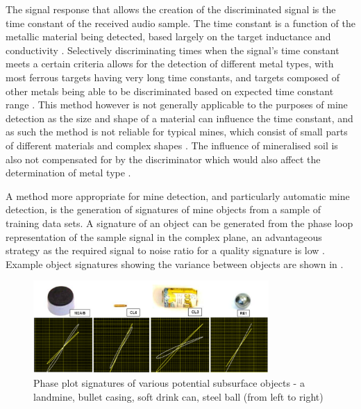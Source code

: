 \documentclass[main.tex]{subfiles}
\begin{document}
The signal response that allows the creation of the discriminated signal is the time constant of the received audio sample. The time constant is a function of the metallic material being detected, based largely on the target inductance and conductivity \parencite{Candy2008}. Selectively discriminating times when the signal's time constant meets a certain criteria allows for the detection of different metal types, with most ferrous targets having very long time constants, and targets composed of other metals being able to be discriminated based on expected time constant range \parencite{Candy2008}. This method however is not generally applicable to the purposes of mine detection as the size and shape of a material can influence the time constant, and as such the method is not reliable for typical mines, which consist of small parts of different materials and complex shapes \parencite{Kruger2006}. The influence of mineralised soil is also not compensated for by the discriminator which would also affect the determination of metal type \parencite{Kruger2006}.

A method more appropriate for mine detection, and particularly automatic mine detection, is the generation of signatures of mine objects from a sample of training data sets. A signature of an object can be generated from the phase loop representation of the sample signal in the complex plane, an advantageous strategy as the required signal to noise ratio for a quality signature is low \parencite{Kruger2006}. Example object signatures showing the variance between objects are shown in .
\begin{figure}[ht]
\includegraphics[width=0.8\textwidth]{3-LiteratureReview/signature.png}
\centering
\caption[Phase plot signatures of various potential subsurface objects]{Phase plot signatures of various potential subsurface objects - a landmine, bullet casing, soft drink can, steel ball (from left to right) \parencite{Kruger2006}} 
\end{figure}
\end{document}
